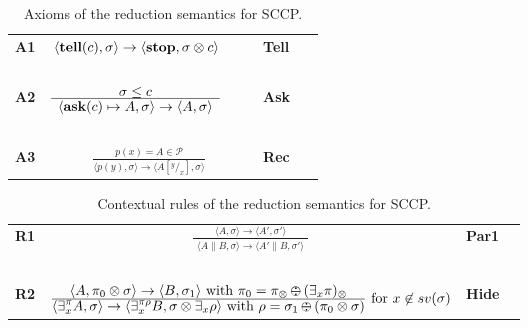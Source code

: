 \documentclass{llncs}
\newcommand{\tell}{{\bf tell}}
\newcommand{\ask}{{\bf ask}}
\newcommand{\ostop}{{\bf stop}}
\def\odiv{\, {\ominus\hspace{-7.7pt} \div} \,}
\begin{document}
\begin{table}  %
   \begin{center}
   \begin{tabular}{lcll} 
   \mbox{\bf A1}& $ {\displaystyle \langle \hbox{\tell}(c), \sigma \rangle \to \langle 
   \hbox{\ostop}, \sigma \otimes c\rangle}$
   \ \ \ & \bf{Tell}&
  \\ 
  &\mbox{   }&\mbox{   } &\mbox{   }
  \\
  \mbox{\bf A2}& $\frac {\displaystyle \sigma \leq c}{\displaystyle
  	\begin{array}{l} \langle \hbox{\ask}(c) \mapsto A, \sigma \rangle \to \langle A, \sigma \rangle   	\end{array}}$
    \ \ \ & \bf{Ask}&
    \\
    &\mbox{   }&\mbox{   }&
    \\
  \mbox{\bf A3}& $\frac {\displaystyle p(x) = A \in \mathcal{P} }
  {\displaystyle\langle p(y),\sigma\rangle \to \langle A[^y/_x], \sigma \rangle}$ 
  &\bf{Rec}&
  \end{tabular}
  \end{center}
\caption{Axioms of the reduction semantics for SCCP.}
\label{fig:operational}
\end{table}

\begin{table}  %
   \begin{center}
   \begin{tabular}{lcll} 
  \mbox{\bf R1}& $\frac {\displaystyle \langle A, \sigma\rangle \to \langle A', \sigma' \rangle} 
  {\displaystyle \begin{array}{l}
                          \langle A\parallel B, \sigma \rangle \to \langle A'\parallel B, \sigma' \rangle
                          \end{array}}$ 
    & \bf{Par1}&
  \\
  & \mbox{   }&\mbox{   }&
  \\
    \mbox{\bf R2}& $\frac {\displaystyle \langle A, \pi_0 \otimes \sigma \rangle
    \to \langle B, \sigma_1 \rangle \text{ with } \pi_0 = \pi_\otimes \odiv (\exists_x \pi)_\otimes}
    {\displaystyle\langle \exists^{\pi}_x A,\sigma\rangle \to \langle 
    \exists^{\pi \rho}_x B, \sigma \otimes \exists_x \rho
    \rangle \text{ with } \rho = \sigma_1 \odiv (\pi_0 \otimes \sigma)} \text{ for } x \not \in sv(\sigma)$
    &\bf{Hide}&
  \end{tabular}
  \end{center}
\caption{Contextual rules of the reduction semantics for SCCP.}
\label{fig:operational2}
\end{table}
\end{document}
